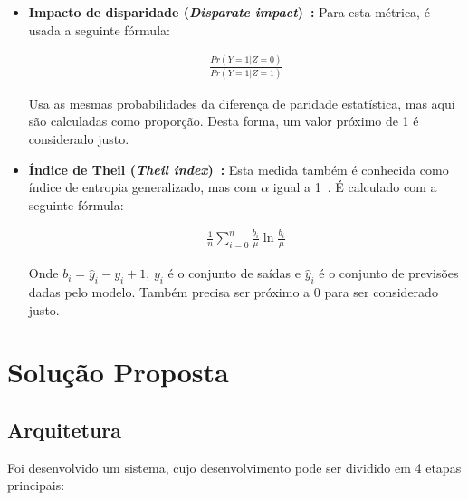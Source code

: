 \documentclass[twocolumn]{article}
\begin{document}
\begin{itemize}
\item \textbf{Impacto de disparidade (\textit{Disparate impact})~\citep{Biswas_2020}:} Para esta métrica, é usada a seguinte fórmula:

\begin{align*}
\frac{Pr(Y=1|Z=0)}{Pr(Y=1|Z=1)}
\end{align*}

Usa as mesmas probabilidades da diferença de paridade estatística, mas aqui são calculadas como proporção. Desta forma, um valor próximo de 1 é considerado justo.

\item \textbf{Índice de Theil (\textit{Theil index})~\citep{Speicher_2018}:} Esta medida também é conhecida como índice de entropia generalizado, mas com $\alpha$ igual a 1~\citep{Speicher_2018}. É calculado com a seguinte fórmula:

\begin{align*}
\frac{1}{n}\sum^{n}_{i=0}\frac{b_i}{\mu}\ln{\frac{b_i}{\mu}}
\end{align*}

Onde $b_i = \hat{y}_i - y_i + 1$, $y_i$ é o conjunto de saídas e $\hat{y}_i$ é o conjunto de previsões dadas pelo modelo. Também precisa ser próximo a 0 para ser considerado justo.

\end{itemize}

\section{Solução Proposta}

\subsection{Arquitetura}

Foi desenvolvido um sistema, cujo desenvolvimento pode ser dividido em 4 etapas principais:
\end{document}
